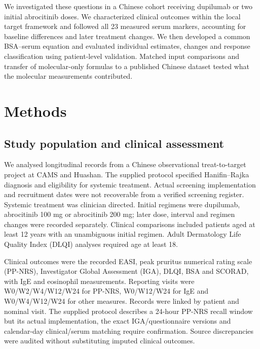 \documentclass[10pt,a4paper]{article}
\begin{document}
We investigated these questions in a Chinese cohort receiving dupilumab or two initial abrocitinib doses. We characterized clinical outcomes within the local target framework and followed all 23 measured serum markers, accounting for baseline differences and later treatment changes. We then developed a common BSA--serum equation and evaluated individual estimates, changes and response classification using patient-level validation. Matched input comparisons and transfer of molecular-only formulas to a published Chinese dataset tested what the molecular measurements contributed.

\section{Methods}
\subsection{Study population and clinical assessment}
We analysed longitudinal records from a Chinese observational treat-to-target project at CAMS and Huashan. The supplied protocol specified Hanifin--Rajka diagnosis and eligibility for systemic treatment. Actual screening implementation and recruitment dates were not recoverable from a verified screening register. Systemic treatment was clinician directed. Initial regimens were dupilumab, abrocitinib 100 mg or abrocitinib 200 mg; later dose, interval and regimen changes were recorded separately. Clinical comparisons included patients aged at least 12 years with an unambiguous initial regimen. Adult Dermatology Life Quality Index (DLQI) analyses required age at least 18.

Clinical outcomes were the recorded EASI, peak pruritus numerical rating scale (PP-NRS), Investigator Global Assessment (IGA), DLQI, BSA and SCORAD, with IgE and eosinophil measurements. Reporting visits were W0/W2/W4/W12/W24 for PP-NRS, W0/W12/W24 for IgE and W0/W4/W12/W24 for other measures. Records were linked by patient and nominal visit. The supplied protocol describes a 24-hour PP-NRS recall window but its actual implementation, the exact IGA/questionnaire versions and calendar-day clinical/serum matching require confirmation. Source discrepancies were audited without substituting imputed clinical outcomes.
\end{document}
